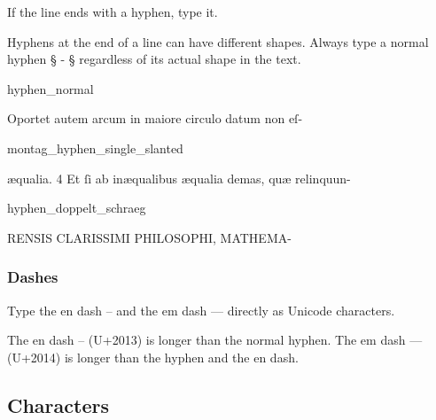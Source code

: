 \begin{mainrule}
If the line ends with a hyphen, type it.
\end{mainrule}

\begin{clarification}
Hyphens at the end of a line can have different shapes. Always type a normal hyphen § - § regardless of its actual shape in the text. %
\end{clarification}

\vspace{2mm}
\begin{sampleImage}{hyphen_normal}
\begin{typeLatin}
Oportet autem arcum in maiore circulo datum non eſ-
\end{typeLatin}
\end{sampleImage}

\begin{sampleImage}{montag_hyphen_single_slanted}
\begin{typeLatin}
æqualia. 4 Et ſi ab inæqualibus æqualia demas, quæ relinquun-
\end{typeLatin}
\end{sampleImage}

\begin{sampleImage}{hyphen_doppelt_schraeg}
\begin{typeLatin}
RENSIS CLARISSIMI PHILOSOPHI, MATHEMA-
\end{typeLatin}
\end{sampleImage}

\subsubsection{Dashes}
\label{section dashes}

\begin{mainrule}
Type the en dash – and the em dash — directly as Unicode characters.
\end{mainrule}

\begin{clarification}
The en dash – (U+2013) is longer than the normal hyphen. The em dash — (U+2014) is longer than the hyphen and the en dash.
\end{clarification}

\tocspace
\subsection{Characters}

